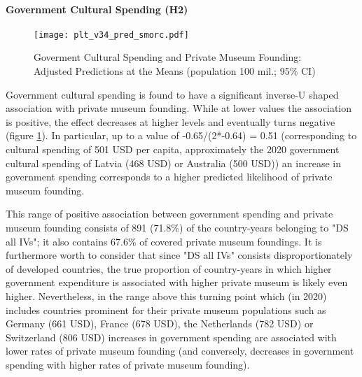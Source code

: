 \documentclass[11pt, authoryear]{elsarticle}
\begin{document}
\paragraph*{Government Cultural Spending (H2)}

\begin{figure}[htbp]
\centering
\texttt{[image: plt\_v34\_pred\_smorc.pdf]}
\caption{\label{fig:pred_smorc}Goverment Cultural Spending and Private Museum Founding: Adjusted Predictions at the Means (population 100 mil.; 95\% CI)}
\end{figure}

Government cultural spending is found to have a significant inverse-U shaped association with private museum founding.
While at lower values the association is positive, the effect decreases at higher levels and eventually turns negative (figure \ref{fig:pred_smorc}).
In particular, up to a value of -0.65/(2*-0.64) = 0.51 (corresponding to cultural spending of 501 USD per capita, approximately the 2020 government cultural spending of Latvia (468 USD) or Australia (500 USD)) an increase in government spending corresponds to a higher predicted likelihood of private museum founding.


This range of positive association between government spending and private museum founding consists of 891 (71.8\%) of the country-years belonging to "DS all IVs"; it also contains 67.6\% of covered private museum foundings.
It is furthermore worth to consider that since "DS all IVs" consists disproportionately of developed countries, the true proportion of country-years in which higher government expenditure is associated with higher private museum is likely even higher.
Nevertheless, in the range above this turning point which (in 2020) includes countries prominent for their private museum populations such as Germany (661 USD), France (678 USD), the Netherlands (782 USD) or Switzerland (806 USD) increases in government spending are associated with lower rates of private museum founding (and conversely, decreases in government spending with higher rates of private museum founding).
\end{document}
